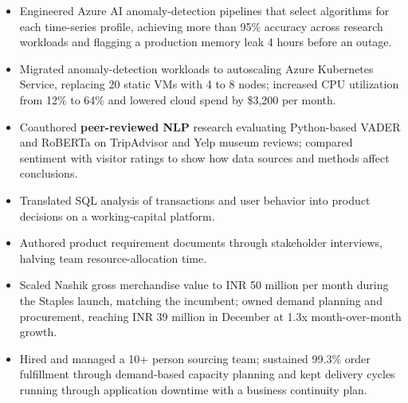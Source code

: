 \documentclass[letterpaper,10pt]{article}
\begin{document}
\begin{itemize}
\item Engineered Azure AI anomaly-detection pipelines that select algorithms for each time-series pro\mbox{f}ile, achieving more than 95\% accuracy across research workloads and \mbox{f}lagging a production memory leak 4 hours before an outage.
\item Migrated anomaly-detection workloads to autoscaling Azure Kubernetes Service, replacing 20 static VMs with 4 to 8 nodes; increased CPU utilization from 12\% to 64\% and lowered cloud spend by \$3,200 per month.
\item Coauthored \textbf{peer-reviewed NLP} research evaluating Python-based VADER and RoBERTa on TripAdvisor and Yelp museum reviews; compared sentiment with visitor ratings to show how data sources and methods a\mbox{f}fect conclusions.
\end{itemize}

\begin{itemize}
\item Translated SQL analysis of transactions and user behavior into product decisions on a working-capital platform.
\item Authored product requirement documents through stakeholder interviews, halving team resource-allocation time.
\end{itemize}

\begin{itemize}
\item Scaled Nashik gross merchandise value to INR 50 million per month during the Staples launch, matching the incumbent; owned demand planning and procurement, reaching INR 39 million in December at 1.3x month-over-month growth.
\item Hired and managed a 10+ person sourcing team; sustained 99.3\% order ful\mbox{f}illment through demand-based capacity planning and kept delivery cycles running through application downtime with a business continuity plan.
\end{itemize}
\end{document}
